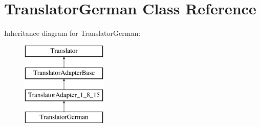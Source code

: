\hypertarget{class_translator_german}{}\section{Translator\+German Class Reference}
\label{class_translator_german}
Inheritance diagram for Translator\+German\+:\begin{figure}[H]
\begin{center}
\leavevmode
\includegraphics[height=4.000000cm]{class_translator_german}
\end{center}
\end{figure}
